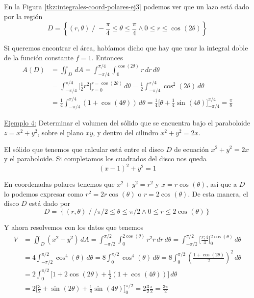 \documentclass[12pt]{article}
\begin{document}
En la Figura \ref{tkz:integrales-coord-polares-ej3} podemos ver que un lazo está dado por la región
\[
  D=\left\{(r,\theta) \;/\; -\frac{\pi}{4}\leq \theta\leq \frac{\pi}{4} \land 0\leq r\leq \cos^{}(2\theta)\right\}
\]

Si queremos encontrar el área, habíamos dicho que hay que usar la integral doble de la función constante $ f=1 $. Entonces
\begin{align*}
  A(D) &= \iint_{D}  \,dA=\int_{-\pi/4}^{\pi/4} \int_{0}^{\cos^{}(2\theta)} r \,dr\,d\theta\\
   &= \int_{-\pi/4}^{\pi/4} \Bigg[\frac{1}{2}r^2\Bigg]_{r=0}^{r=\cos^{}(2\theta)} \,d\theta=\frac{1}{2}\int_{-\pi/4}^{\pi/4} \cos^{2}(2\theta) \,d\theta\\
   &= \frac{1}{4}\int_{-\pi/4}^{\pi/4} \left(1+\cos^{}(4\theta)\right) \,d\theta = \frac{1}{4}\Bigg[\theta+\frac{1}{4}\sin^{}(4\theta)\Bigg]_{-\pi/4}^{\pi/4}=\frac{\pi}{8}
\end{align*}

\underline{Ejemplo 4:} Determinar el volumen del sólido que se encuentra bajo el paraboloide $ z=x^2+y^2 $, sobre el plano $ xy $, y dentro del cilindro $ x^2+y^2=2x $.

El sólido que tenemos que calcular está entre el disco $ D $ de ecuación $ x^2+y^2=2x $ y el paraboloide. Si completamos los cuadrados del disco nos queda
\[
	(x-1)^2+y^2=1
\]

En coordenadas polares tenemos que $ x^2+y^2=r^2 $ y $ x=r\cos^{}(\theta) $, así que a $ D $ lo podemos expresar como $ r^2=2r\cos^{}(\theta) $ o $ r=2\cos^{}(\theta) $. De esta manera, el disco $ D $ está dado por 
\[
  D=\left\{(r,\theta) \;/\; /\pi/2\leq \theta\leq \pi/2 \land 0\leq r\leq 2\cos^{}(\theta)\right\}
\]

Y ahora resolvemos con los datos que tenemos
\begin{align*}
  V &= \iint_{D} \left(x^2+y^2\right) \,dA=\int_{-\pi/2}^{\pi/2} \int_{0}^{2\cos^{}(\theta)} r^2r \,dr\,d\theta=\int_{-\pi/2}^{\pi/2} \Bigg[\frac{r;4}{4}\Bigg]_{0}^{2\cos^{}(\theta)} \,d\theta\\
   &= 4\int_{-\pi/2}^{\pi/2} \cos^{4}(\theta) \,d\theta=8\int_{0}^{\pi/2} \cos^{4}(\theta) \,d\theta=8\int_{0}^{\pi/2} \left(\frac{1+\cos^{}(2\theta)}{2}\right)^2 \,d\theta\\
    &= 2\int_{0}^{\pi/2} \Bigg[1+2\cos^{}(2\theta)+\frac{1}{2}\left(1+\cos^{}(4\theta)\right)\Bigg] \,d\theta\\
     &= 2\Bigg[\frac{3}{2}+\sin^{}(2\theta)+\frac{1}{8}\sin^{}(4\theta)\Bigg]_{0}^{\pi/2}=2\frac{3}{2}\frac{\pi}{2}=\frac{3\pi}{2}
\end{align*}
\end{document}
